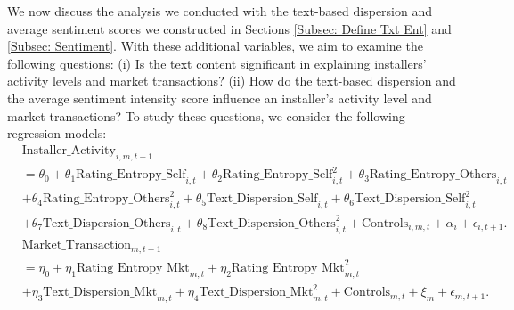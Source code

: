 \documentclass[mnsc,blindrev]{informs3}
\begin{document}
	We now discuss the analysis we conducted with the text-based dispersion and average sentiment scores we constructed in Sections \ref{Subsec: Define Txt Ent} and \ref{Subsec: Sentiment}. With these additional variables, we aim to examine the following questions: (i) Is the text content significant in explaining installers' activity levels and market transactions? (ii) How do the text-based dispersion and the average sentiment intensity score influence an installer's activity level and market transactions? %
To study these questions, we consider the following regression models:
	\begin{align}  \nonumber
	& \text{Installer\_Activity}_{i,m,t+1} \\ \nonumber
	& = \theta_{0}+ \theta_{1} \text{Rating\_Entropy\_Self}_{i,t}+ \theta_{2} \text{Rating\_Entropy\_Self}_{i,t}^ {2} + \theta_{3} \text{Rating\_Entropy\_Others}_{i,t} \\ \nonumber
	& + \theta_{4} \text{Rating\_Entropy\_Others}_{i,t}^{2} + \theta_{5} \text{Text\_Dispersion\_Self}_{i,t}+  \theta_{6}  \text{Text\_Dispersion\_Self}_{i,t}^ {2}  \\ \label{model_ind_textbased}
	&+ \theta_{7}  \text{Text\_Dispersion\_Others}_{i,t} + \theta_{8} \text{Text\_Dispersion\_Others}_{i,t}^{2}  + \text{Controls}_{i,m,t}+ \alpha_{i} + \epsilon_{i,t+1}.\\ \nonumber
	& \text{Market\_Transaction}_{m,t+1} \\ \nonumber
	& =  \eta_{0} + \eta_{1} \text{Rating\_Entropy\_Mkt}_{m,t}+  \eta_{2} \text{Rating\_Entropy\_Mkt}_{m,t}^2 \\ \label{reg: market-level-textbased}
	&+ \eta_{3} \text{Text\_Dispersion\_Mkt}_{m,t}+ \eta_{4} \text{Text\_Dispersion\_Mkt}_{m,t}^2  + \text{Controls}_{m,t}  + \xi_{m} + \epsilon_{m,t+1}.
	\end{align}
	
\end{document}
